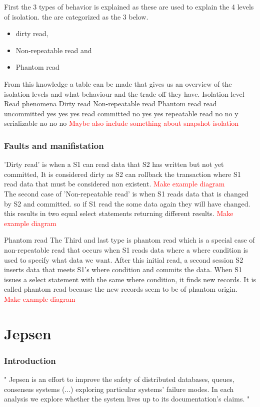 \documentclass[a4paper,10pt,titlepage]{report}
\begin{document}
First the 3 types of behavior is explained as these are used to explain the 4 levels of isolation. the are categorized as the 3 below.
\begin{itemize}
\item dirty read,
\item Non-repeatable read and
\item Phantom read
\end{itemize}

From this knowledge a table can be made that gives us an overview of the isolation levels and what behaviour and the trade off they have.
Isolation level	Read phenomena
Dirty read	Non-repeatable read	Phantom read
read uncommitted	yes	yes	yes
read committed	no	yes	yes
repeatable read	no	no	y
serializable	no	no	no
\textcolor{red}{Maybe also include something about snapshot isolation}

\subsection{Faults and manifistation}

'Dirty read' is when a S1 can read data that S2 has written but not yet committed, It is considered dirty as S2 can rollback the transaction where S1 read data that must be considered non existent. \textcolor{red}{Make example diagram}
\\
The second case of 'Non-repeatable read' is when S1 reads data that is changed by S2 and committed. so if S1 read the some data again they will have changed. this results in two equal select statements returning different results.  \textcolor{red}{Make example diagram}

Phantom read
The Third and last type is phantom read which is a special case of non-repeatable read that occurs when S1 reads data where a where condition is used to specify what data we want. After this initial read, a second session S2 inserts data that meets S1's where condition and commits the data. When S1 issues a select statement with the same where condition, it finds new records. It is called phantom read because the new records seem to be of phantom origin.
 \textcolor{red}{Make example diagram}





\chapter{Jepsen}


\subsection{Introduction}
"
Jepsen is an effort to improve the safety of distributed databases, queues, consensus systems  (...) exploring particular systems’ failure modes. In each analysis we explore whether the system lives up to its documentation’s claims.
"\cite{jepsonio}
\\
\end{document}
